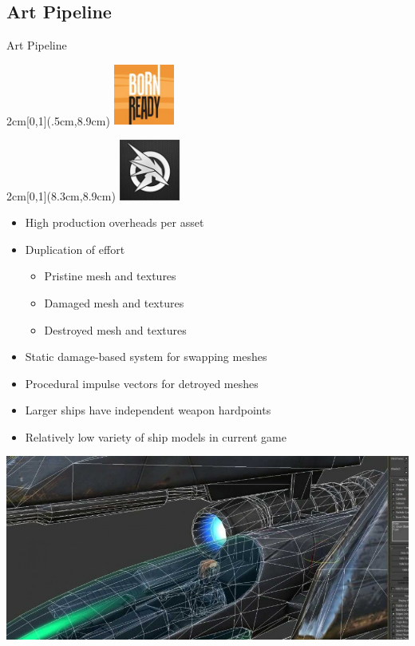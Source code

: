 \documentclass[t]{beamer}
\begin{document}
	\subsection{Art Pipeline}
		\begin{frame}{Art Pipeline}
			\begin{textblock*}{2cm}[0,1](.5cm,8.9cm) %
			\includegraphics[width=2cm]{bornready.jpg}
			\end{textblock*}
			\begin{textblock*}{2cm}[0,1](8.3cm,8.9cm) %
			\includegraphics[width=2cm]{strikesuitzero.jpg}
			\end{textblock*}
			\begin{itemize}
				\item High production overheads per asset
				\item Duplication of effort
				\begin{itemize}
					\item Pristine mesh and textures
					\item Damaged mesh and textures
					\item Destroyed mesh and textures
				\end{itemize}
				\item Static damage-based system for swapping meshes
				\item Procedural impulse vectors for detroyed meshes
				\item Larger ships have independent weapon hardpoints
				\item Relatively low variety of ship models in current game
			\end{itemize}
			\begin{center}
				\includegraphics[width=0.5\linewidth]{mesh.jpg}
			\end{center}
		
		\end{frame}
\end{document}
